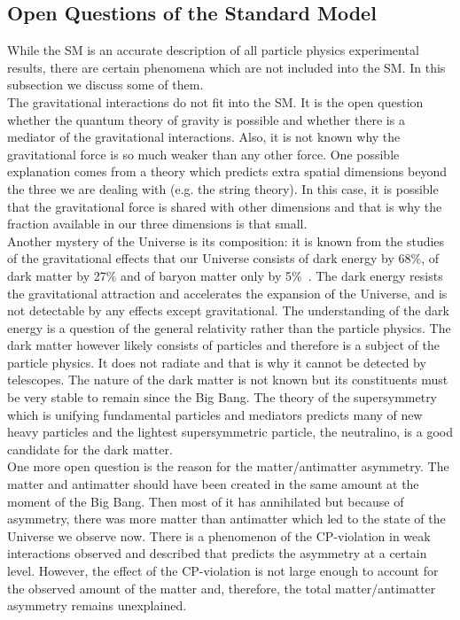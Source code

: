 \subsection{Open Questions of the Standard Model}


While the SM is an accurate description of all particle physics experimental results, there are certain phenomena which are not included into the SM. In this subsection we discuss some of them.\\

The gravitational interactions do not fit into the SM. It is the open question whether the quantum theory of gravity is possible and whether there is a mediator of the gravitational interactions. Also, it is not known why the gravitational force is so much weaker than any other force. One possible explanation comes from a theory which predicts extra spatial dimensions beyond the three we are dealing with (e.g. the string theory). In this case, it is possible that the gravitational force is shared with other dimensions and that is why the fraction available in our three dimensions is that small.\\

Another mystery of the Universe is its composition: it is known from the studies of the gravitational effects that our Universe consists of dark energy by 68\%, of dark matter by 27\% and of baryon matter only by 5\%~\cite{ref_NASA}. The dark energy resists the gravitational attraction and accelerates the expansion of the Universe, and is not detectable by any effects except gravitational. The understanding of the dark energy is a question of the general relativity rather than the particle physics. The dark matter however likely consists of particles and therefore is a subject of the particle physics. It does not radiate and that is why it cannot be detected by telescopes. The nature of the dark matter is not known but its constituents must be very stable to remain since the Big Bang. The theory of the supersymmetry which is unifying fundamental particles and mediators predicts many of new heavy particles and the lightest supersymmetric particle, the neutralino, is a good candidate for the dark matter.\\

One more open question is the reason for the matter/antimatter asymmetry. The matter and antimatter should have been created in the same amount at the moment of the Big Bang. Then most of it has annihilated but because of asymmetry, there was more matter than antimatter which led to the state of the Universe we observe now. There is a phenomenon of the CP-violation in weak interactions observed and described that predicts the asymmetry at a certain level. However, the effect of the CP-violation is not large enough to account for the observed amount of the matter and, therefore, the total matter/antimatter asymmetry remains unexplained. \\

